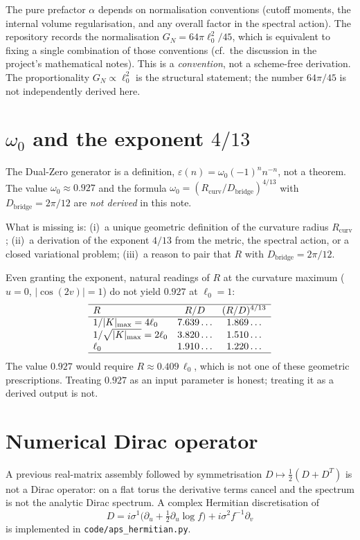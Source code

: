\documentclass[11pt,a4paper]{article}
\theoremstyle{definition}
\theoremstyle{remark}
\begin{document}
The pure prefactor $\alpha$ depends on normalisation conventions
(cutoff moments, the internal volume regularisation, and any overall
factor in the spectral action). The repository records the normalisation
$G_N=64\pi\ell_0^2/45$, which is equivalent to fixing a single
combination of those conventions
(cf.\ the discussion in the project's mathematical notes). This is a
\emph{convention}, not a scheme-free derivation. The proportionality
$G_N\propto\ell_0^2$ is the structural statement; the number $64\pi/45$
is not independently derived here.

\section{$\omega_0$ and the exponent $4/13$}
\label{sec:omega}

The Dual-Zero generator is a definition,
$\varepsilon(n)=\omega_0(-1)^n n^{-n}$, not a theorem. The value
$\omega_0\approx 0.927$ and the formula
$\omega_0=(R_{\mathrm{curv}}/D_{\mathrm{bridge}})^{4/13}$ with
$D_{\mathrm{bridge}}=2\pi/12$ are \emph{not derived} in this note.

What is missing is: (i)~a unique geometric definition of the curvature
radius $R_{\mathrm{curv}}$; (ii)~a derivation of the exponent $4/13$ from
the metric, the spectral action, or a closed variational problem;
(iii)~a reason to pair that $R$ with $D_{\mathrm{bridge}}=2\pi/12$.

Even granting the exponent, natural readings of $R$ at the curvature
maximum ($u=0$, $|\cos(2v)|=1$) do not yield $0.927$ at $\ell_0=1$:
\[
\begin{array}{lcc}
\hline
R & R/D & (R/D)^{4/13}\\
\hline
1/|K|_{\max}=4\ell_0 & 7.639\ldots & 1.869\ldots\\
1/\sqrt{|K|_{\max}}=2\ell_0 & 3.820\ldots & 1.510\ldots\\
\ell_0 & 1.910\ldots & 1.220\ldots\\
\hline
\end{array}
\]
The value $0.927$ would require $R\approx 0.409\,\ell_0$, which is not
one of these geometric prescriptions. Treating $0.927$ as an input
parameter is honest; treating it as a derived output is not.

\section{Numerical Dirac operator}
\label{sec:dirac}

A previous real-matrix assembly followed by symmetrisation
$D\mapsto\tfrac12(D+D^T)$ is not a Dirac operator: on a flat torus the
derivative terms cancel and the spectrum is not the analytic Dirac
spectrum. A complex Hermitian discretisation of
\[
  D=i\sigma^1\bigl(\partial_u+\tfrac12\partial_u\log f\bigr)+i\sigma^2 f^{-1}\partial_v
\]
is implemented in \texttt{code/aps\_hermitian.py}.
\end{document}
